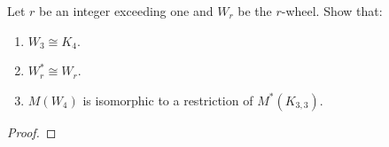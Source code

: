 \prob
{
    Let $r$ be an integer exceeding one and $W_r$ be the $r$-wheel. Show that:
    \begin{enumerate}[label=(\roman*)]
        \item $W_3 \cong K_4$.
        \item $W_r^* \cong W_r$.
        \item $M(W_4)$ is isomorphic to a restriction of $M^*(K_{3,3})$.
    \end{enumerate}
}
\begin{proof}
\end{proof}